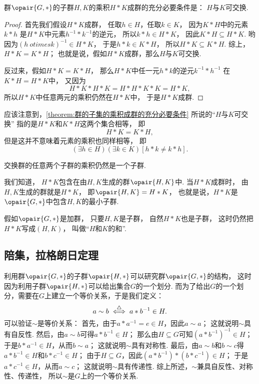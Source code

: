 \begin{theorem}\label{theorem:群的子集的乘积成群的充分必要条件}
群\(\opair{G,*}\)的子群\(H,K\)的乘积\(H * K\)成群的充分必要条件是：
\(H\)与\(K\)可交换.
\begin{proof}
首先我们假设\(H * K\)成群，
任取\(h \in H\)，任取\(k \in K\)，
因为\(K * H\)中的元素\(k * h\)
是\(H * K\)中元素\(h^{-1} * k^{-1}\)的逆元，
所以\(k * h \in H * K\)，
因此\(K * H \subseteq H * K\).
哟因为\((h\ otimes k)^{-1} \in H * K\)，
于是\(h * k \in K * H\)，
所以\(H * K \subseteq K * H\).
综上，\(H * K = K * H\)；
也就是说，假如\(H * K\)成群，那么\(H\)与\(K\)可交换.

反过来，假如\(H * K = K * H\)，
那么\(H * K\)中任一元\(h * k\)的逆元\(k^{-1} * h^{-1}\)
在\(K * H = H * K\)中，
又因为\[
	H * K * H * K
	= H * H * K * K
	= H * K,
\]
所以\(H * K\)中任意两元的乘积仍然在\(H * K\)中，
于是\(H * K\)成群.
\end{proof}
\end{theorem}

应该注意到，\cref{theorem:群的子集的乘积成群的充分必要条件} 所说的“\(H\)与\(K\)可交换”
指的是\(H * K\)和\(K * H\)这两个集合相等，
即\[
	H * K = K * H,
\]
但是这并不意味着元素的乘积也同样相等，
即\[
	(\exists h \in H)(\exists k \in K)[h * k \neq k * h].
\]

\begin{corollary}
交换群的任意两个子群的乘积仍然是一个子群.
\end{corollary}

我们知道，
\(H * K\)包含在由\(H,K\)生成的群\(\opair{H,K}\)中.
当\(H * K\)成群时，
由\(H,K\)生成的群就是\(H * K\)，
即\(\opair{H,K} = H * K\)，
也就是说，\(H * K\)是\(\opair{G,*}\)中包含\(H,K\)的最小子群.

假如\(\opair{G,*}\)是加群，
只要\(H,K\)是子群，
自然\(H * K\)也是子群，
这时仍然把\(H * K\)写成\((H,K)\)，
叫做“\(H\)和\(K\)的和”.

\subsection{陪集，拉格朗日定理}
\begingroup
\def\RQuotient{G/\kern-2pt\sim}
\def\LQuotient{G/\kern-2pt\backsim}

利用群\(\opair{G,*}\)的子群\(\opair{H,*}\)可以研究群\(\opair{G,*}\)的结构，
这时因为利用子群\(\opair{H,*}\)可以给出集合\(G\)的一个划分.
而为了给出\(G\)的一个划分，需要在\(G\)上建立一个等价关系，于是我们定义：\[
	a \sim b
	\overset{\triangle}{\iff}
	a * b^{-1} \in H.
\]
可以验证\(\sim\)是等价关系：
首先，由于\(a * a^{-1} = e \in H\)，因此\(a \sim a\)；
这就说明\(\sim\)具有自反性.
然后，由\(a \sim b\)可得\(a * b^{-1} \in H\)；
那么由\(H \subseteq G\)可知\((a * b^{-1})^{-1} \in H\)；
于是\(b * a^{-1} \in H\)，从而\(b \sim a\)；
这就说明\(\sim\)具有对称性.
最后，由\(a \sim b\)和\(b \sim c\)得\(a * b^{-1} \in H\)和\(b * c^{-1} \in H\)；
由于\(H \subseteq G\)，因此\((a * b^{-1}) * (b * c^{-1}) \in H\)；
于是\(a * c^{-1} \in H\)，从而\(a \sim c\)；
这就说明\(\sim\)具有传递性.
综上所述，\(\sim\)兼具自反性、对称性、传递性，
所以\(\sim\)是\(G\)上的一个等价关系.

